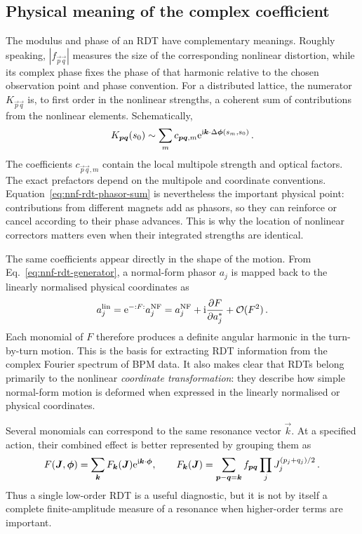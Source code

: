 \subsection{Physical meaning of the complex coefficient}

The modulus and phase of an RDT have complementary meanings.  Roughly
speaking, $|f_{\vec p\vec q}|$ measures the size of the corresponding
nonlinear distortion, while its complex phase fixes the phase of that
harmonic relative to the chosen observation point and phase convention.  For
a distributed lattice, the numerator $K_{\vec p\vec q}$ is, to first order in
the nonlinear strengths, a coherent sum of contributions from the nonlinear
elements.  Schematically,
\begin{equation}\label{eq:nnf-rdt-phasor-sum}
    K_{\bm{p}\bm{q}}(s_0)
    \sim \sum_m c_{\bm{p}\bm{q},m}
    \mathrm{e}^{\mathrm{i}\bm{k}\cdot\Delta\bm{\phi}(s_m,s_0)}\,.
\end{equation}
The coefficients $c_{\vec p\vec q,m}$ contain the local multipole strength and
optical factors.  The exact prefactors depend on the multipole and coordinate
conventions.  Equation~\eqref{eq:nnf-rdt-phasor-sum} is nevertheless the
important physical point: contributions from different magnets add as
phasors, so they can reinforce or cancel according to their phase advances.
This is why the location of nonlinear correctors matters even when their
integrated strengths are identical.

The same coefficients appear directly in the shape of the motion.  From
Eq.~\eqref{eq:nnf-rdt-generator}, a normal-form phasor $a_j$ is mapped back to
the linearly normalised physical coordinates as
\begin{equation}\label{eq:nnf-rdt-spectral-lines}
    a_j^{\mathrm{lin}}
    = \mathrm{e}^{-:F:}a_j^{\mathrm{NF}}
    = a_j^{\mathrm{NF}}
    + \mathrm{i}\frac{\partial F}{\partial a_j^*}
    + \mathcal O(F^2)\,.
\end{equation}
Each monomial of $F$ therefore produces a definite angular harmonic in the
turn-by-turn motion.  This is the basis for extracting RDT information from
the complex Fourier spectrum of BPM data.  It also makes clear that RDTs
belong primarily to the nonlinear \emph{coordinate transformation}: they
describe how simple normal-form motion is deformed when expressed in the
linearly normalised or physical coordinates.

Several monomials can correspond to the same resonance vector $\vec k$.  At a
specified action, their combined effect is better represented by grouping them
as
\begin{equation}\label{eq:nnf-rdt-action-dependent}
    F(\bm{J},\bm{\phi})
    = \sum_{\bm{k}}F_{\bm{k}}(\bm{J})
    \mathrm{e}^{\mathrm{i}\bm{k}\cdot\bm{\phi}},
    \qquad
    F_{\bm{k}}(\bm{J})
    = \sum_{\bm{p}-\bm{q}=\bm{k}}
    f_{\bm{p}\bm{q}}
    \prod_j J_j^{(p_j+q_j)/2}\,.
\end{equation}
Thus a single low-order RDT is a useful diagnostic, but it is not by itself a
complete finite-amplitude measure of a resonance when higher-order terms are
important.


